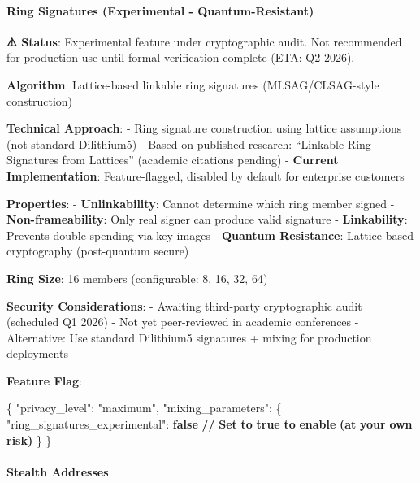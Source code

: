 \documentclass[
  11pt,
]{article}
\newenvironment{Shaded}{\begin{snugshade}}{\end{snugshade}}
\newcommand{\DataTypeTok}[1]{\textcolor[rgb]{0.13,0.29,0.53}{#1}}
\newcommand{\ErrorTok}[1]{\textcolor[rgb]{0.64,0.00,0.00}{\textbf{#1}}}
\newcommand{\FunctionTok}[1]{\textcolor[rgb]{0.00,0.00,0.00}{#1}}
\newcommand{\KeywordTok}[1]{\textcolor[rgb]{0.13,0.29,0.53}{\textbf{#1}}}
\newcommand{\StringTok}[1]{\textcolor[rgb]{0.31,0.60,0.02}{#1}}
\begin{document}
\hypertarget{ring-signatures-experimental---quantum-resistant}{%
\paragraph{Ring Signatures (Experimental -
Quantum-Resistant)}\label{ring-signatures-experimental---quantum-resistant}}

\textbf{⚠️ Status}: Experimental feature under cryptographic audit. Not
recommended for production use until formal verification complete (ETA:
Q2 2026).

\textbf{Algorithm}: Lattice-based linkable ring signatures
(MLSAG/CLSAG-style construction)

\textbf{Technical Approach}: - Ring signature construction using lattice
assumptions (not standard Dilithium5) - Based on published research:
``Linkable Ring Signatures from Lattices'' (academic citations pending)
- \textbf{Current Implementation}: Feature-flagged, disabled by default
for enterprise customers

\textbf{Properties}: - \textbf{Unlinkability}: Cannot determine which
ring member signed - \textbf{Non-frameability}: Only real signer can
produce valid signature - \textbf{Linkability}: Prevents double-spending
via key images - \textbf{Quantum Resistance}: Lattice-based cryptography
(post-quantum secure)

\textbf{Ring Size}: 16 members (configurable: 8, 16, 32, 64)

\textbf{Security Considerations}: - Awaiting third-party cryptographic
audit (scheduled Q1 2026) - Not yet peer-reviewed in academic
conferences - Alternative: Use standard Dilithium5 signatures + mixing
for production deployments

\textbf{Feature Flag}:

\begin{Shaded}
\begin{Highlighting}[]
\FunctionTok{\{}
  \DataTypeTok{"privacy\_level"}\FunctionTok{:} \StringTok{"maximum"}\FunctionTok{,}
  \DataTypeTok{"mixing\_parameters"}\FunctionTok{:} \FunctionTok{\{}
    \DataTypeTok{"ring\_signatures\_experimental"}\FunctionTok{:} \KeywordTok{false}  \ErrorTok{//} \ErrorTok{Set} \ErrorTok{to} \KeywordTok{true} \ErrorTok{to} \ErrorTok{enable} \ErrorTok{(at} \ErrorTok{your} \ErrorTok{own} \ErrorTok{risk)}
  \FunctionTok{\}}
\FunctionTok{\}}
\end{Highlighting}
\end{Shaded}

\hypertarget{stealth-addresses}{%
\paragraph{Stealth Addresses}\label{stealth-addresses}}
\end{document}
